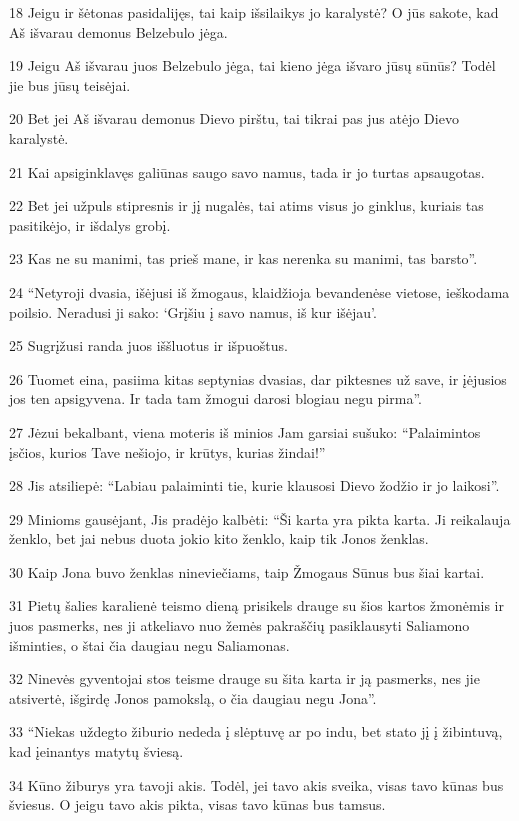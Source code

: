 \par 18 Jeigu ir šėtonas pasidalijęs, tai kaip išsilaikys jo karalystė? O jūs sakote, kad Aš išvarau demonus Belzebulo jėga. 
\par 19 Jeigu Aš išvarau juos Belzebulo jėga, tai kieno jėga išvaro jūsų sūnūs? Todėl jie bus jūsų teisėjai. 
\par 20 Bet jei Aš išvarau demonus Dievo pirštu, tai tikrai pas jus atėjo Dievo karalystė. 
\par 21 Kai apsiginklavęs galiūnas saugo savo namus, tada ir jo turtas apsaugotas. 
\par 22 Bet jei užpuls stipresnis ir jį nugalės, tai atims visus jo ginklus, kuriais tas pasitikėjo, ir išdalys grobį. 
\par 23 Kas ne su manimi, tas prieš mane, ir kas nerenka su manimi, tas barsto”. 
\par 24 “Netyroji dvasia, išėjusi iš žmogaus, klaidžioja bevandenėse vietose, ieškodama poilsio. Neradusi ji sako: ‘Grįšiu į savo namus, iš kur išėjau’. 
\par 25 Sugrįžusi randa juos iššluotus ir išpuoštus. 
\par 26 Tuomet eina, pasiima kitas septynias dvasias, dar piktesnes už save, ir įėjusios jos ten apsigyvena. Ir tada tam žmogui darosi blogiau negu pirma”. 
\par 27 Jėzui bekalbant, viena moteris iš minios Jam garsiai sušuko: “Palaimintos įsčios, kurios Tave nešiojo, ir krūtys, kurias žindai!” 
\par 28 Jis atsiliepė: “Labiau palaiminti tie, kurie klausosi Dievo žodžio ir jo laikosi”. 
\par 29 Minioms gausėjant, Jis pradėjo kalbėti: “Ši karta yra pikta karta. Ji reikalauja ženklo, bet jai nebus duota jokio kito ženklo, kaip tik Jonos ženklas. 
\par 30 Kaip Jona buvo ženklas nineviečiams, taip Žmogaus Sūnus bus šiai kartai. 
\par 31 Pietų šalies karalienė teismo dieną prisikels drauge su šios kartos žmonėmis ir juos pasmerks, nes ji atkeliavo nuo žemės pakraščių pasiklausyti Saliamono išminties, o štai čia daugiau negu Saliamonas. 
\par 32 Ninevės gyventojai stos teisme drauge su šita karta ir ją pasmerks, nes jie atsivertė, išgirdę Jonos pamokslą, o čia daugiau negu Jona”. 
\par 33 “Niekas uždegto žiburio nededa į slėptuvę ar po indu, bet stato jį į žibintuvą, kad įeinantys matytų šviesą. 
\par 34 Kūno žiburys yra tavoji akis. Todėl, jei tavo akis sveika, visas tavo kūnas bus šviesus. O jeigu tavo akis pikta, visas tavo kūnas bus tamsus. 
